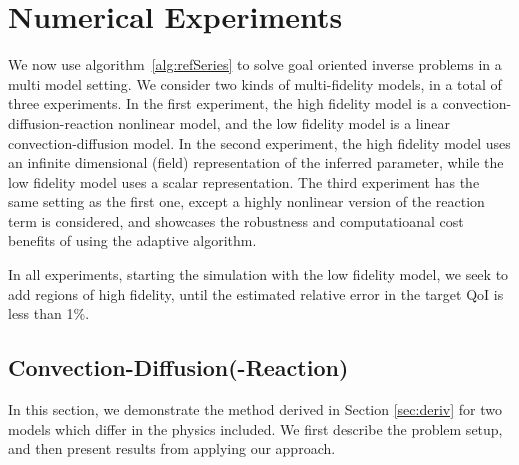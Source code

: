 \section{Numerical Experiments}\label{sect:numexp}
%
We now use algorithm~\ref{alg:refSeries} to solve goal oriented inverse problems in a multi model setting. We consider two kinds of multi-fidelity models, in a total of three experiments. In the first experiment, the high fidelity model is a convection-diffusion-reaction nonlinear model, and the low fidelity model is a linear convection-diffusion model. In the second experiment, the high fidelity model uses an infinite dimensional (field) representation of the inferred parameter, while the low fidelity model uses a scalar representation. The third experiment has the same setting as the first one, except a highly nonlinear version of the reaction term is considered, and showcases the robustness and computatioanal cost benefits of using the adaptive algorithm.

In all experiments, starting the simulation with the low fidelity model, we seek to add regions of high fidelity, until the estimated relative error in the target QoI is less than 1$\%$. 
%

\subsection{Convection-Diffusion(-Reaction)} \label{sec:cdvcdr}
%
In this section, we demonstrate the method derived in Section \ref{sec:deriv} for two models which differ in the physics included. We first describe the problem setup, and then present results from applying our approach.
%
